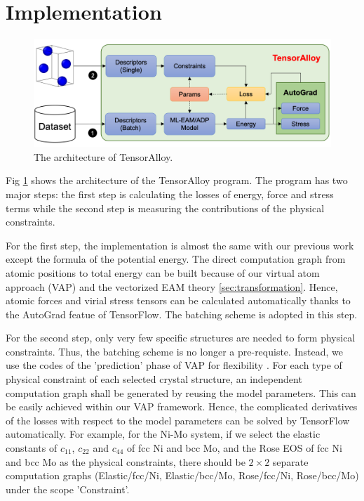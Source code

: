 \documentclass[final,3p,times]{elsarticle}
\begin{document}
% 
%
\section{Implementation}
\label{sec:implementation}

% 
%
\begin{figure}
\centering
\includegraphics[scale=0.6]{tensoralloy.png}
\caption{\label{fig:tensoralloy} The architecture of TensorAlloy.}
\end{figure}

Fig \ref{fig:tensoralloy} shows the architecture of the TensorAlloy program. The 
program has two major steps: the first step is calculating the losses of energy,
force and stress terms while the second step is measuring the contributions of 
the physical constraints. 

For the first step, the implementation is almost the same with our previous 
work \cite{TensorAlloy} except the formula of the potential energy. The direct
computation graph from atomic positions to total energy can be built because of
our virtual atom approach (VAP) \cite{TensorAlloy} and the vectorized EAM theory
\ref{sec:transformation}. Hence, atomic forces and virial stress tensors can be 
calculated automatically thanks to the AutoGrad featue of TensorFlow. The 
batching scheme is adopted in this step.

For the second step, only very few specific 
structures are needed to form physical constraints. Thus, the batching scheme is 
no longer a pre-requiste. Instead, we use the codes of the 'prediction' phase of 
VAP for flexibility \cite{TensorAlloy}. For each type of physical constraint of 
each selected crystal structure, an independent computation graph shall be 
generated by reusing the model parameters. This can be easily achieved within 
our VAP framework. Hence, the complicated derivatives of the losses with respect 
to the model parameters can be solved by TensorFlow automatically.
For example, for the Ni-Mo system, if we select the elastic constants of 
$c_{11}$, $c_{22}$ and $c_{44}$ of fcc Ni and bcc Mo, and the Rose EOS of fcc 
Ni and bcc Mo as the physical constraints, there should be $2 \times 2$ separate 
computation graphs (\textrm{Elastic/fcc/Ni, Elastic/bcc/Mo, Rose/fcc/Ni, 
Rose/bcc/Mo}) under the scope 'Constraint'.
\end{document}
